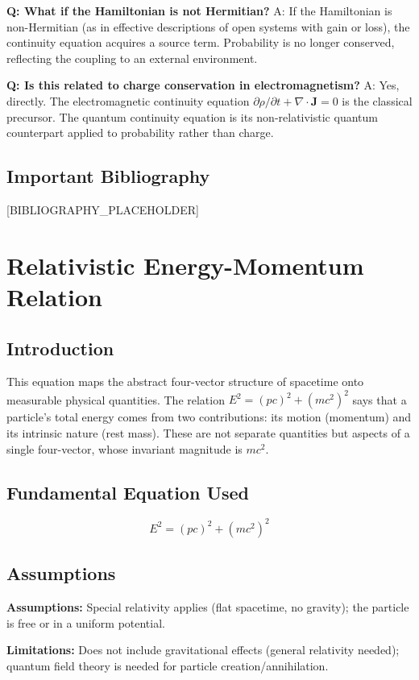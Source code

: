 \documentclass[11pt,openright]{book}
\begin{document}
\textbf{Q: What if the Hamiltonian is not Hermitian?}
A: If the Hamiltonian is non-Hermitian (as in effective descriptions of open systems with gain or loss), the continuity equation acquires a source term. Probability is no longer conserved, reflecting the coupling to an external environment.

\textbf{Q: Is this related to charge conservation in electromagnetism?}
A: Yes, directly. The electromagnetic continuity equation $\partial\rho/\partial t + \nabla \cdot \mathbf{J} = 0$ is the classical precursor. The quantum continuity equation is its non-relativistic quantum counterpart applied to probability rather than charge.
\section*{Important Bibliography}

[BIBLIOGRAPHY_PLACEHOLDER]


\chapter{Relativistic Energy-Momentum Relation}

\section*{Introduction}

This equation maps the abstract four-vector structure of spacetime onto measurable physical quantities. The relation $E^2 = (pc)^2 + (mc^2)^2$ says that a particle's total energy comes from two contributions: its motion (momentum) and its intrinsic nature (rest mass). These are not separate quantities but aspects of a single four-vector, whose invariant magnitude is $mc^2$.
\section*{Fundamental Equation Used}

\begin{equation}
E^2 = (pc)^2 + (mc^2)^2
\end{equation}
\section*{Assumptions}

\textbf{Assumptions:} Special relativity applies (flat spacetime, no gravity); the particle is free or in a uniform potential.


\textbf{Limitations:} Does not include gravitational effects (general relativity needed); quantum field theory is needed for particle creation/annihilation.
\end{document}
